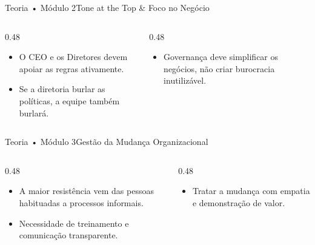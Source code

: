 \begin{senaiframe}{Teoria • Módulo 2}{Tone at the Top \& Foco no Negócio}
  \begin{columns}[t]
    \begin{column}{0.48\textwidth}
      \begin{tcolorbox}[senairedcard, title={Tone at the Top}]
        \begin{itemize}
          \item O CEO e os Diretores devem apoiar as regras ativamente.
          \item Se a diretoria burlar as políticas, a equipe também burlará.
        \end{itemize}
      \end{tcolorbox}
    \end{column}
    \begin{column}{0.48\textwidth}
      \begin{tcolorbox}[senaigreencard, title={Foco no Negócio}]
        \begin{itemize}
          \item Governança deve simplificar os negócios, não criar burocracia inutilizável.
        \end{itemize}
      \end{tcolorbox}
    \end{column}
  \end{columns}
\end{senaiframe}

\begin{senaiframe}{Teoria • Módulo 3}{Gestão da Mudança Organizacional}
  \begin{columns}[t]
    \begin{column}{0.48\textwidth}
      \begin{tcolorbox}[senaiambercard, title={A Barreira Cultural}]
        \begin{itemize}
          \item A maior resistência vem das pessoas habituadas a processos informais.
          \item Necessidade de treinamento e comunicação transparente.
        \end{itemize}
      \end{tcolorbox}
    \end{column}
    \begin{column}{0.48\textwidth}
      \begin{tcolorbox}[senaibluecard, title={O Fator Humano}]
        \begin{itemize}
          \item Tratar a mudança com empatia e demonstração de valor.
        \end{itemize}
      \end{tcolorbox}
    \end{column}
  \end{columns}
\end{senaiframe}

